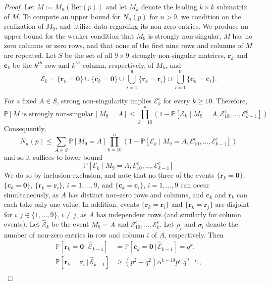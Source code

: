 \documentclass[10pt,a4paper]{amsart}
\begin{document}
\begin{proof}
Let $M:= M_n(\mathrm{Ber}(p))$ and let $M_k$ denote the leading $k \times k$ submatrix of $M$. To compute an upper bound for $N_n(p)$ for $n > 9$, we condition on the realization of $M_9$, and utilize data regarding its non-zero entries. We produce an upper bound for the weaker condition that $M_9$ is strongly non-singular, $M$ has no zero columns or zero rows, and that none of the first nine rows and columns of $M$ are repeated. Let $S$ be the set of all $9\times 9$ strongly non-singular matrices, $\bm{r}_k$ and $\bm{c}_k$ be the $k^{th}$ row and $k^{th}$ column, respectively, of $M_k$, and \[\mathcal{E}_k = \{ \bm{r}_k = \bm{0}\} \cup \{ \bm{c}_k = \bm{0}\}\cup \bigcup_{i=1}^9 \{ \bm{r}_k = \bm{r}_i\} \cup \bigcup_{i=1}^9 \{ \bm{c}_k = \bm{c}_i\}. \]

For a fixed $A\in S$, strong non-singularity implies $\mathcal E_k^c$ for every $k\ge10$. Therefore,
\[
\mathbb{P}\left[M\text{ is strongly non-singular}\mid M_9=A\right] \le \prod_{k=10}^n \left(1-\mathbb{P}\left[\mathcal E_k \mid M_9=A,\mathcal E_{10}^c,\ldots,\mathcal E_{k-1}^c \right] \right)
\]
Consequently,
\[
N_n(p) \le \sum_{A \in S} \mathbb{P}[M_9 = A] \prod_{k = 10}^n \left(
1- \mathbb{P}\left[ \mathcal{E}_k \mid M_9 = A, \mathcal{E}_{10}^c,\ldots, \mathcal{E}_{k-1}^c \right] \right)
\]
and so it suffices to lower bound
\[
\mathbb{P}\left[ \mathcal{E}_k \mid M_9 = A, \mathcal{E}_{10}^c,\ldots, \mathcal{E}_{k-1}^c \right]
\]
We do so by inclusion-exclusion, and note that no three of the events $\{ \bm{r}_k = \bm{0}\}$, $\{ \bm{c}_k = \bm{0}\}$, $\{ \bm{r}_k = \bm{r}_i\}$, $i = 1,\ldots, 9$, and  $\{ \bm{c}_k = \bm{c}_i\}$, $i = 1,\ldots,9$ can occur simultaneously, as $A$ has distinct non-zero rows and columns, and $\bm{c}_k$ and $\bm{r}_k$ can each take only one value. In addition, events $\{\bm{r}_k = \bm{r}_i\}$ and $\{\bm{r}_k = \bm{r}_j\}$ are disjoint for $i,j \in \{1,\ldots,9\}$, $i \ne j$, as $A$ has independent rows (and similarly for column events). Let $ \mathcal{\hat E}_{k}$ be the event $M_9 = A$ and $\mathcal{E}_{10}^c,\ldots,\mathcal{E}_{k}^c$. Let $\rho_i$ and $\sigma_i$ denote the number of non-zero entries in row and column $i$ of $A$, respectively. Then
\begin{align*}
\mathbb{P}\left[\bm{r}_k = \bm{0} \, | \, \mathcal{\hat E}_{k-1}\right] &= \mathbb{P}\left[\bm{c}_k = \bm{0} \, | \, \mathcal{\hat E}_{k-1}\right] = q^k, \\
\mathbb{P}\left[\bm{r}_k = \bm{r}_i \, | \, \mathcal{\hat E}_{k-1}\right] &\ge (p^2 + q^2) \alpha^{k-10} p^{\rho_i} q^{9-\rho_i}, \\

\end{align*}
\end{proof}
\end{document}
